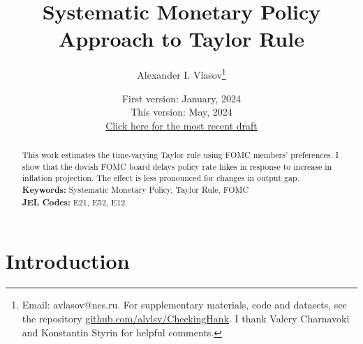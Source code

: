 \documentclass[11pt]{article}
\title{Systematic Monetary Policy Approach to Taylor Rule}
\author{Alexander I. Vlasov\thanks{Email: avlasov@nes.ru. For supplementary materials, code and datasets, see the repository \href{https://github.com/alvlsv/CheckingHank}{github.com/alvlsv/CheckingHank}. I thank Valery Charnavoki and Konstantin Styrin for helpful comments.}}
\date{\normalsize First version: January, 2024\\\vspace{1ex} This version: May, 2024\\ \vspace{1ex}
\href{https://github.com/alvlsv/CheckingHank/blob/main/Checking_HANK/Paper/CheckingHANK.pdf}{Click here for the most recent draft}}
\begin{document}
\maketitle



\begin{abstract}
    \noindent This work estimates the time-varying Taylor rule using FOMC members' preferences. I show that the dovish FOMC board delays policy rate hikes in response to increase in inflation projection. The effect is less pronounced for changes in output gap.
    \\
    \noindent\textbf{Keywords:} Systematic Monetary Policy, Taylor Rule, FOMC
    \\
    \noindent\textbf{JEL Codes:} E21, E52, E12 \\
    \bigskip
\end{abstract}

\section{Introduction}


\end{document}
